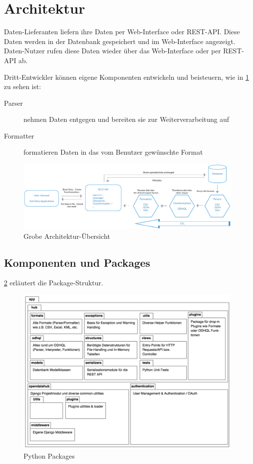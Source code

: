 \section{Architektur}
\xxx
Daten-Lieferanten liefern ihre Daten per Web-Interface oder REST-API. Diese Daten werden in der Datenbank gespeichert und im Web-Interface angezeigt. Daten-Nutzer rufen diese Daten wieder über das Web-Interface oder per REST-API ab. 

Dritt-Entwickler können eigene Komponenten entwickeln und beisteuern, wie in \cref{fig:pd:arch-overview} zu sehen ist:
\begin{description}
\item[Parser] nehmen Daten entgegen und bereiten sie zur Weiterverarbeitung auf
\item[Formatter] formatieren Daten in das vom Benutzer gewünschte Format
\end{description}

\begin{figure}[H]
    \centering
    \includegraphics[width=\linewidth]{fig/ODH-Architecture-Overview}
    \caption{Grobe Architektur-Übersicht}
    \label{fig:pd:arch-overview}
\end{figure}

\subsection{Komponenten und Packages}

\cref{fig:pd:pypackages} erläutert die Package-Struktur.

\begin{figure}[H]
    \centering
    \includegraphics[width=\linewidth]{fig/packages}
    \caption{Python Packages}
    \label{fig:pd:pypackages}
\end{figure}

